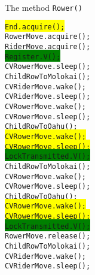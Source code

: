 \documentclass{article}
\begin{document}
\begin{spacing}{1.1}
\begin{algorithm}[bpth]
  \caption{The method \texttt{Rower()}}
  \begin{algorithmic}[1]
    
    \STATE \colorbox{yellow}{\texttt{End.acquire();}}\\
  \STATE \texttt{RowerMove.acquire();}\\
  \STATE \texttt{RiderMove.acquire();}\\
  \STATE \colorbox{green}{\texttt{Register.V();}}\\
  \STATE \texttt{CVRowerMove.sleep();}\\
  \STATE \texttt{ChildRowToMolokai();}\\
  \STATE \texttt{CVRiderMove.wake();}\\
  \STATE \texttt{CVRiderMove.sleep();}\\
  \STATE \texttt{CVRowerMove.wake();}\\
  \STATE \texttt{CVRowerMove.sleep();}\\
  \STATE \texttt{ChildRowToOahu();}\\
  \STATE \colorbox{yellow}{\texttt{CVRowerMove.wake();}}\\
  \STATE \colorbox{yellow}{\texttt{CVRowerMove.sleep();}}\\
  \STATE \colorbox{green}{\texttt{LockTransmitted.V();}}\\
  \ELSE
  \STATE \texttt{ChildRowToMolokai();}\\
  \STATE \texttt{CVRowerMove.wake();}\\
  \STATE \texttt{CVRowerMove.sleep();}\\
  \STATE \texttt{ChildRowToOahu();}\\
  \STATE \colorbox{yellow}{\texttt{CVRowerMove.wake();}}\\
  \STATE \colorbox{yellow}{\texttt{CVRowerMove.sleep();}}\\
  \STATE \colorbox{green}{\texttt{LockTransmitted.V();}}\\
  \ENDIF
  \ENDWHILE
  \STATE \texttt{RowerMove.release();}\\
  \STATE \texttt{ChildRowToMolokai();}\\
  \STATE \texttt{CVRiderMove.wake();}\\
  \STATE \texttt{CVRiderMove.sleep();}\\

\end{algorithmic}
\end{algorithm}
\end{spacing}
\end{document}
